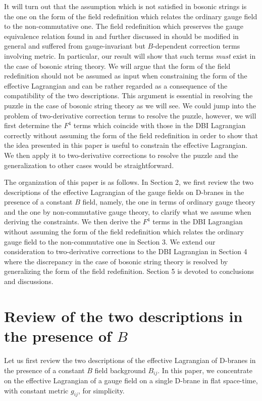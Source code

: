 \documentclass[a4paper,12pt]{article}
\begin{document}
It will turn out that
the assumption which is not satisfied in bosonic strings
is the one on the form of the field redefinition
which relates the ordinary gauge field
to the non-commutative one.
The field redefinition
which preserves the gauge equivalence relation
found in \cite{SW} and further discussed in \cite{AK}
should be modified in general
and suffered from gauge-invariant
but $B$-dependent correction terms
involving metric.
In particular, our result will show that
such terms {\it must} exist in the case of bosonic string theory.
We will argue that the form of the field redefinition
should not be assumed as input when constraining
the form of the effective Lagrangian
and can be rather regarded as a consequence of the compatibility
of the two descriptions.
This argument is essential in resolving the puzzle
in the case of bosonic string theory as we will see.
We could jump into the problem of
two-derivative correction terms
to resolve the puzzle, however,
we will first determine the $F^4$ terms which 
coincide with those in the DBI Lagrangian correctly
without assuming the form of the field redefinition
in order to show that the idea presented in this paper is 
useful to constrain the effective Lagrangian.
We then apply it to two-derivative corrections
to resolve the puzzle
and the generalization to other cases would be straightforward.

The organization of this paper is as follows.
In Section 2, we first review the two descriptions of
the effective Lagrangian of the gauge fields on D-branes
in the presence of a constant $B$ field, namely,
the one in terms of ordinary gauge theory
and the one by non-commutative gauge theory,
to clarify what we assume when deriving the constraints.
We then derive the $F^4$ terms in the DBI Lagrangian
without assuming the form of the field redefinition
which relates the ordinary gauge field to the non-commutative one
in Section 3.
We extend our consideration to two-derivative corrections
to the DBI Lagrangian in Section 4
where the discrepancy in the case of bosonic string theory
is resolved by generalizing the form of the field redefinition.
Section 5 is devoted to conclusions and discussions.

\section{Review of the two descriptions in the presence of $B$}
\setcounter{equation}{0}
\indent

Let us first review the two descriptions
of the effective Lagrangian of D-branes
in the presence of a constant $B$ field background $B_{ij}$.
In this paper, we concentrate
on the effective Lagrangian of a gauge field on a single D-brane
in flat space-time, with constant metric $g_{ij}$, for simplicity.
\end{document}
